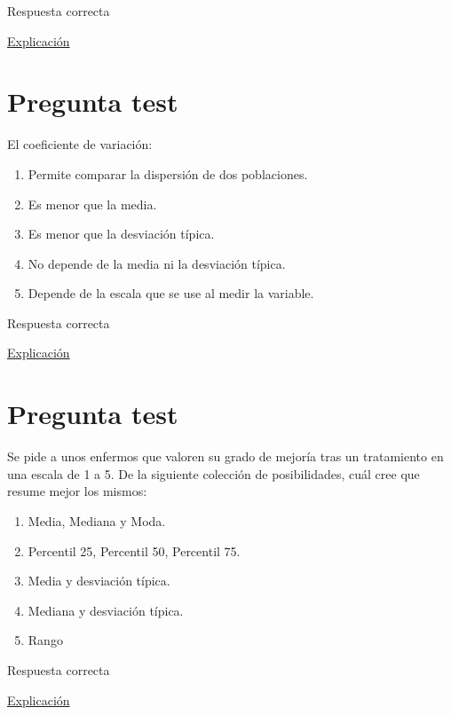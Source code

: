 \documentclass[
]{book}
\providecommand{\tightlist}{%
  \setlength{\itemsep}{0pt}\setlength{\parskip}{0pt}}
\begin{document}
Respuesta correcta

\href{https://www.statisticshowto.com/what-is-a-bimodal-distribution/}{Explicación}

\hypertarget{pregunta-test-67}{%
\section{Pregunta test}\label{pregunta-test-67}}

El coeficiente de variación:

\begin{enumerate}
\def\labelenumi{\alph{enumi})}
\tightlist
\item
  Permite comparar la dispersión de dos poblaciones.
\item
  Es menor que la media.
\item
  Es menor que la desviación típica.
\item
  No depende de la media ni la desviación típica.
\item
  Depende de la escala que se use al medir la variable.
\end{enumerate}

Respuesta correcta

\href{https://en.wikipedia.org/wiki/Coefficient_of_variation}{Explicación}

\hypertarget{pregunta-test-68}{%
\section{Pregunta test}\label{pregunta-test-68}}

Se pide a unos enfermos que valoren su grado de mejoría tras un tratamiento en una escala de 1 a 5. De la siguiente colección de posibilidades, cuál cree que resume mejor los mismos:

\begin{enumerate}
\def\labelenumi{\alph{enumi})}
\tightlist
\item
  Media, Mediana y Moda.
\item
  Percentil 25, Percentil 50, Percentil 75.
\item
  Media y desviación típica.
\item
  Mediana y desviación típica.
\item
  Rango
\end{enumerate}

Respuesta correcta

\href{https://1fjmanzano.github.io/bioestadistica/medidas-de-posicio\%CC\%81n-dispersio\%CC\%81n-y-forma.html\#medidas-de-dispersio\%CC\%81n}{Explicación}
\end{document}

